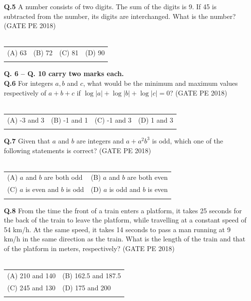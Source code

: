 \documentclass[12pt,a4paper]{article}
\begin{document}
\noindent\textbf{Q.5} A number consists of two digits. The sum of the digits is 9. If 45 is subtracted from the number, its digits are interchanged. What is the number? \hfill(GATE PE 2018)\\\\
\begin{tabular}{llll}
(A) 63 & (B) 72 & (C) 81 & (D) 90 \\\\   
\end{tabular}

\noindent\textbf{Q. 6 – Q. 10 carry two marks each.} \\[0.8em]

\noindent\textbf{Q.6} For integers $a, b$ and $c$, what would be the minimum and maximum values respectively of $a + b + c$ if $\log |a| + \log |b| + \log |c| = 0$? \hfill(GATE PE 2018)\\\\
\begin{tabular}{llll}
(A) -3 and 3 & (B) -1 and 1 & (C) -1 and 3 & (D) 1 and 3\\\\
\end{tabular}

\noindent\textbf{Q.7} Given that $a$ and $b$ are integers and $a + a^2b^3$ is odd, which one of the following statements is correct? \hfill(GATE PE 2018)\\\\

\begin{tabular}{ll}
(A) $a$ and $b$ are both odd & (B) $a$ and $b$ are both even\\
(C) $a$ is even and $b$ is odd & (D) $a$ is odd and $b$ is even\\\\
\end{tabular}

\noindent\textbf{Q.8} From the time the front of a train enters a platform, it takes 25 seconds for the back of the train to leave the platform, while travelling at a constant speed of 54 km/h. At the same speed, it takes 14 seconds to pass a man running at 9 km/h in the same direction as the
train. What is the length of the train and that of the platform in meters, respectively? \hfill(GATE PE 2018)\\\\

\begin{tabular}{ll}
(A) 210 and 140 & (B) 162.5 and 187.5\\
(C) 245 and 130 & (D) 175 and 200\\\\
\end{tabular}
\end{document}
